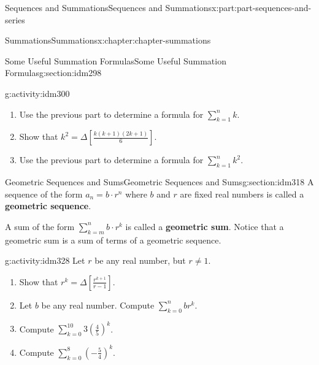 \documentclass[oneside,10pt,]{book}
\newcommand{\terminology}[1]{\textbf{#1}}
\begin{document}
\begin{partptx}{Sequences and Summations}{}{Sequences and Summations}{}{}{x:part:part-sequences-and-series}
\begin{chapterptx}{Summations}{}{Summations}{}{}{x:chapter:chapter-summations}
\begin{sectionptx}{Some Useful Summation Formulas}{}{Some Useful Summation Formulas}{}{}{g:section:idm298}
\begin{activity}{}{g:activity:idm300}
\begin{enumerate}[font=\bfseries,label=(\alph*),ref=\alph*]
\item{}Use the previous part to determine a formula for \(\displaystyle\sum_{k=1}^n k\).%
\item{}Show that \(k^2 = \Delta \left[ \frac{k(k+1)(2k+1)}{6}\right]\).%
\item{}Use the previous part to determine a formula for \(\displaystyle\sum_{k=1}^n k^2\).%
\end{enumerate}
\end{activity}
\end{sectionptx}
%
%
\typeout{************************************************}
\typeout{************************************************}
%
\begin{sectionptx}{Geometric Sequences and Sums}{}{Geometric Sequences and Sums}{}{}{g:section:idm318}
A sequence of the form \(a_n = b\cdot r^n\) where \(b\) and \(r\) are fixed real numbers is called a \terminology{geometric sequence}.%
\par
A sum of the form \(\displaystyle\sum_{k=m}^n b\cdot r^k\) is called a \terminology{geometric sum}. Notice that a geometric sum is a sum of terms of a geometric sequence.%
\begin{activity}{}{g:activity:idm328}%
Let \(r\) be any real number, but \(r \neq 1\).%
\begin{enumerate}[font=\bfseries,label=(\alph*),ref=\alph*]
\item{}Show that \(\displaystyle r^k = \Delta \left[\frac{r^{k+1}}{r-1}\right]\).%
\item{}Let \(b\) be any real number. Compute \(\displaystyle\sum_{k=0}^n b r^k\).%
\item{}Compute \(\displaystyle\sum_{k=0}^{10} 3 \left(\frac{4}{5}\right)^k\).%
\item{}Compute \(\displaystyle\sum_{k=0}^8  \left(-\frac{5}{4}\right)^k\).%
\end{enumerate}
\end{activity}
\end{sectionptx}
\end{chapterptx}
\end{partptx}
%
%
\typeout{************************************************}
\typeout{************************************************}
%
\end{document}
